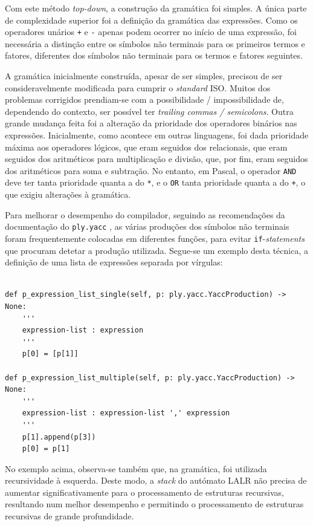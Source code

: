 \documentclass[12pt, a4paper]{article}
\begin{document}
Com este método \emph{top-down}, a construção da gramática foi simples. A única parte de
complexidade superior foi a definição da gramática das expressões. Como os operadores unários
\texttt{+} e \texttt{-} apenas podem ocorrer no início de uma expressão, foi necessária a distinção
entre os símbolos não terminais para os primeiros termos e fatores, diferentes dos símbolos não
terminais para os termos e fatores seguintes.

A gramática inicialmente construída, apesar de ser simples, precisou de ser consideravelmente
modificada para cumprir o \emph{standard} ISO. Muitos dos problemas corrigidos prendiam-se com
a possibilidade / impossibilidade de, dependendo do contexto, ser possível ter \emph{trailing
commas / semicolons}. Outra grande mudança feita foi a alteração da prioridade dos operadores
binários nas expressões. Inicialmente, como acontece em outras linguagens, foi dada prioridade
máxima aos operadores lógicos, que eram seguidos dos relacionais, que eram seguidos dos aritméticos
para multiplicação e divisão, que, por fim, eram seguidos dos aritméticos para soma e subtração. No
entanto, em Pascal, o operador \texttt{AND} deve ter tanta prioridade quanta a do \texttt{*}, e o
\texttt{OR} tanta prioridade quanta a do \texttt{+}, o que exigiu alterações à gramática.

Para melhorar o desempenho do compilador, seguindo as recomendações da documentação do
\texttt{ply.yacc} \cite{ply}, as várias produções dos símbolos não terminais foram frequentemente
colocadas em diferentes funções, para evitar \texttt{if}-\emph{statements} que procuram detetar a
produção utilizada. Segue-se um exemplo desta técnica, a definição de uma lista de expressões
separada por vírgulas:

\begin{lstlisting}

def p_expression_list_single(self, p: ply.yacc.YaccProduction) -> None:
    '''
    expression-list : expression
    '''
    p[0] = [p[1]]

def p_expression_list_multiple(self, p: ply.yacc.YaccProduction) -> None:
    '''
    expression-list : expression-list ',' expression
    '''
    p[1].append(p[3])
    p[0] = p[1]
\end{lstlisting}

No exemplo acima, observa-se também que, na gramática, foi utilizada recursividade à esquerda. Deste
modo, a \emph{stack} do autómato LALR não precisa de aumentar significativamente para o
processamento de estruturas recursivas, resultando num melhor desempenho e permitindo o
processamento de estruturas recursivas de grande profundidade.
\end{document}
